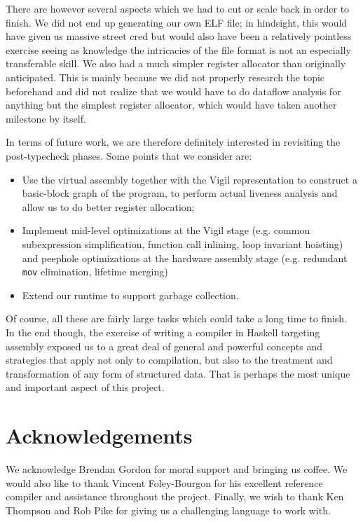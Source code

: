 \documentclass[letterpaper,11pt]{article}
\begin{document}
There are however several aspects which we had to cut or scale back in order to finish. We did not end up generating our own ELF file; in hindsight, this would have given us massive street cred but would also have been a relatively pointless exercise seeing as knowledge the intricacies of the file format is not an especially transferable skill. We also had a much simpler register allocator than originally anticipated. This is mainly because we did not properly research the topic beforehand and did not realize that we would have to do dataflow analysis for anything but the simplest register allocator, which would have taken another milestone by itself.

In terms of future work, we are therefore definitely interested in revisiting the post-typecheck phases. Some points that we consider are:
\begin{itemize}
\item Use the virtual assembly together with the Vigil representation to construct a basic-block graph of the program, to perform actual liveness analysis and allow us to do better register allocation;
\item Implement mid-level optimizations at the Vigil stage (e.g. common subexpression simplification, function call inlining, loop invariant hoisting) and peephole optimizations at the hardware assembly stage (e.g. redundant \texttt{mov} elimination, lifetime merging)
\item Extend our runtime to support garbage collection.
\end{itemize}

Of course, all these are fairly large tasks which could take a long time to finish. In the end though, the exercise of writing a compiler in Haskell targeting assembly exposed us to a great deal of general and powerful concepts and strategies that apply not only to compilation, but also to the treatment and transformation of any form of structured data. That is perhaps the most unique and important aspect of this project.

\section{Acknowledgements}
We acknowledge Brendan Gordon for moral support and bringing us coffee. We would also like to thank Vincent Foley-Bourgon for his excellent reference compiler and assistance throughout the project. Finally, we wish to thank Ken Thompson and Rob Pike for giving us a challenging language to work with.
\end{document}
